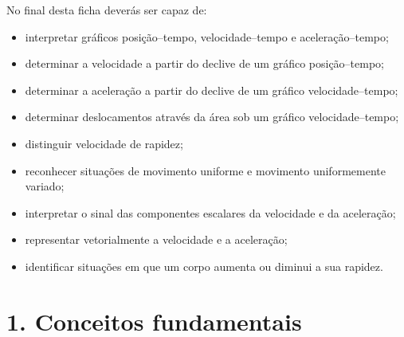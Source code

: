 \documentclass[11pt,a4paper]{article}
\begin{document}
	\begin{objetivos}
		
		No final desta ficha deverás ser capaz de:
		
		\begin{itemize}
			
			\item interpretar gráficos posição--tempo, velocidade--tempo e
			aceleração--tempo;
			
			\item determinar a velocidade a partir do declive de um gráfico
			posição--tempo;
			
			\item determinar a aceleração a partir do declive de um gráfico
			velocidade--tempo;
			
			\item determinar deslocamentos através da área sob um gráfico
			velocidade--tempo;
			
			\item distinguir velocidade de rapidez;
			
			\item reconhecer situações de movimento uniforme e movimento uniformemente
			variado;
			
			\item interpretar o sinal das componentes escalares da velocidade e da
			aceleração;
			
			\item representar vetorialmente a velocidade e a aceleração;
			
			\item identificar situações em que um corpo aumenta ou diminui a sua
			rapidez.
			
		\end{itemize}
		
	\end{objetivos}
	
	\section{1. Conceitos fundamentais}
	
\end{document}
